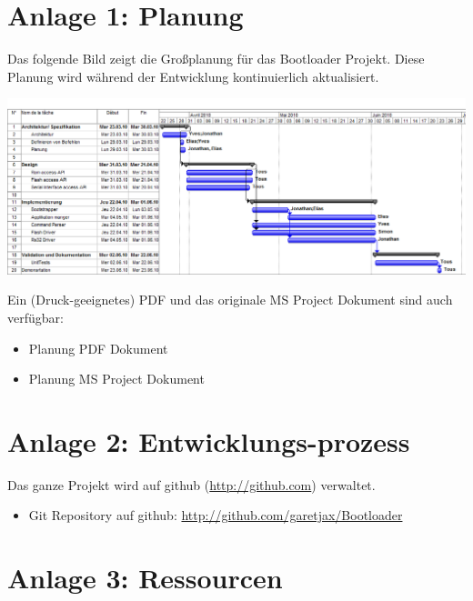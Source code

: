 \documentclass[letterpaper,10pt,ngerman]{manual}
\begin{document}
\section{Anlage 1: Planung}

Das folgende Bild zeigt die Großplanung für das Bootloader Projekt. Diese Planung wird während der Entwicklung kontinuierlich aktualisiert.

\includegraphics{planung.png}

Ein (Druck-geeignetes) PDF und das originale MS Project Dokument sind auch verfügbar:
\begin{itemize}
\item {} 
Planung PDF Dokument

\item {} 
Planung MS Project Dokument

\end{itemize}


\section{Anlage 2: Entwicklungs-prozess}

Das ganze Projekt wird auf github (\href{http://github.com}{http://github.com}) verwaltet.
\begin{itemize}
\item {} 
Git Repository auf github: \href{http://github.com/garetjax/Bootloader}{http://github.com/garetjax/Bootloader}

\end{itemize}
\hypertarget{todo-0}{}

\section{Anlage 3: Ressourcen}
\end{document}
